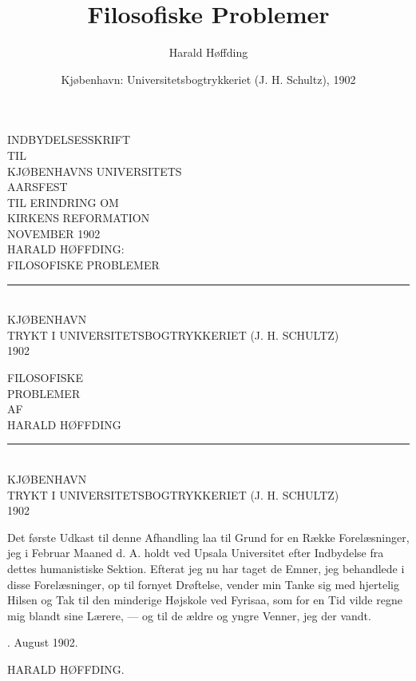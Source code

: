 \documentclass[12pt,a4paper,openany]{book}
\title{\textbf{Filosofiske Problemer}}
\author{Harald Høffding}
\date{Kjøbenhavn: Universitetsbogtrykkeriet (J. H. Schultz), 1902}
\begin{document}
\maketitle
\thispagestyle{empty}
\clearpage

\begin{center}
INDBYDELSESSKRIFT\\[2pt]
{\scriptsize TIL}\\[2pt]
{\large KJØBENHAVNS UNIVERSITETS}\\
{\large AARSFEST}\\[2pt]
{\scriptsize TIL ERINDRING OM}\\[2pt]
{\large KIRKENS REFORMATION}\\[2pt]
NOVEMBER 1902\\[2em]
HARALD HØFFDING:\\
FILOSOFISKE PROBLEMER\\[1em]
\rule{1cm}{0.4pt}\\[1em]
{\small KJØBENHAVN}\\
{\scriptsize TRYKT I UNIVERSITETSBOGTRYKKERIET (J. H. SCHULTZ)}\\
{\scriptsize 1902}
\end{center}
\clearpage

\begin{center}
{\Huge FILOSOFISKE}\\[10pt]
{\Huge PROBLEMER}\\[1.5em]
{\scriptsize AF}\\[1.5em]
{\large HARALD HØFFDING}\\[3em]
\rule{1.5cm}{0.4pt}\\[3em]
KJØBENHAVN\\
{\scriptsize TRYKT I UNIVERSITETSBOGTRYKKERIET (J. H. SCHULTZ)}\\
{\scriptsize 1902}
\end{center}
\clearpage

\begin{itshape}
Det første Udkast til denne Afhandling laa til Grund for en Række
Forelæsninger, jeg i Februar Maaned d. A. holdt ved Upsala Universitet efter
Indbydelse fra dettes humanistiske Sektion. Efterat jeg nu har taget de Emner,
jeg behandlede i disse Forelæsninger, op til fornyet Drøftelse, vender min Tanke
sig med hjertelig Hilsen og Tak til den minderige Højskole ved Fyrisaa, som for
en Tid vilde regne mig blandt sine Lærere, --- og til de ældre og yngre Venner,
jeg der vandt.

. August 1902.

\begin{flushright}HARALD HØFFDING.\end{flushright}
\end{itshape}
\clearpage
\end{document}
